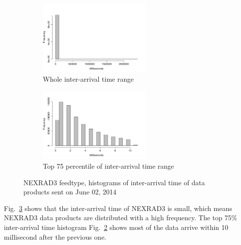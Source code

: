 \begin{figure}[htb!]
\centering
    \begin{subfigure}{0.5\linewidth}
        \centering
        \includegraphics[width=2.2in]{figures/Inter-hist-NEXRAD30602.pdf}
        \caption{Whole inter-arrival time range}
        \label{NEXRAD3_Inter_Whole}
    \end{subfigure}\hfill
    \begin{subfigure}{0.5\linewidth}
	\centering
    \includegraphics[width=2.2in]{figures/Inter-hist-NEXRAD30602-TOP75.pdf}
        \caption{Top 75 percentile of inter-arrival time range}
        \label{NEXRAD3_Inter_75}
    \end{subfigure}\hfill
    \caption{NEXRAD3 feedtype, histograms of inter-arrival time of data products sent on June 02, 2014}
    \label{NEXRAD3_time}
\end{figure}

Fig.~\ref{NEXRAD3_time} shows that the inter-arrival time of NEXRAD3 is small, which means NEXRAD3 data products are distributed with a high frequency. The top 75\% inter-arrival time histogram Fig.~\ref{NEXRAD3_Inter_75} shows most of the data arrive within 10 millisecond after the previous one.

